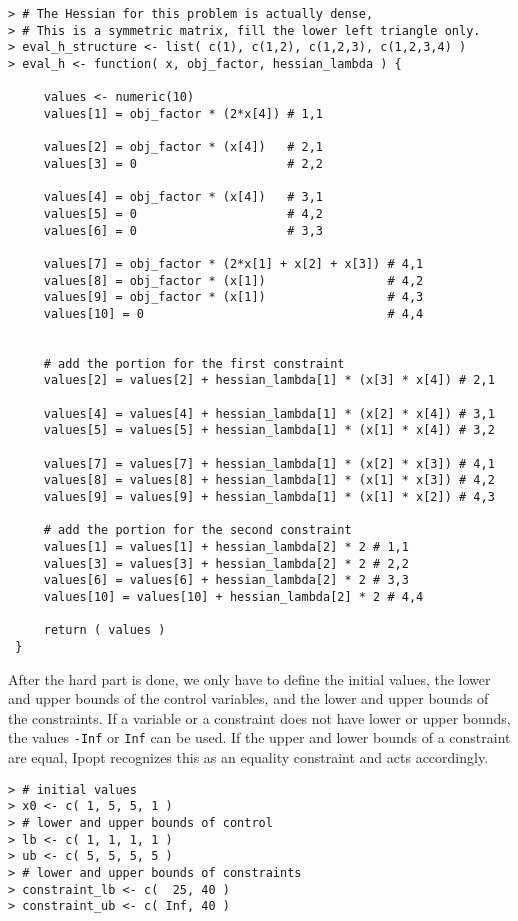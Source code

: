 \documentclass[10pt]{article}
\begin{document}
\begin{verbatim}
> # The Hessian for this problem is actually dense, 
> # This is a symmetric matrix, fill the lower left triangle only.
> eval_h_structure <- list( c(1), c(1,2), c(1,2,3), c(1,2,3,4) )
> eval_h <- function( x, obj_factor, hessian_lambda ) {
 
     values <- numeric(10)
     values[1] = obj_factor * (2*x[4]) # 1,1
 
     values[2] = obj_factor * (x[4])   # 2,1
     values[3] = 0                     # 2,2
 
     values[4] = obj_factor * (x[4])   # 3,1
     values[5] = 0                     # 4,2
     values[6] = 0                     # 3,3
 
     values[7] = obj_factor * (2*x[1] + x[2] + x[3]) # 4,1
     values[8] = obj_factor * (x[1])                 # 4,2
     values[9] = obj_factor * (x[1])                 # 4,3
     values[10] = 0                                  # 4,4
 
 
     # add the portion for the first constraint
     values[2] = values[2] + hessian_lambda[1] * (x[3] * x[4]) # 2,1
     
     values[4] = values[4] + hessian_lambda[1] * (x[2] * x[4]) # 3,1
     values[5] = values[5] + hessian_lambda[1] * (x[1] * x[4]) # 3,2
 
     values[7] = values[7] + hessian_lambda[1] * (x[2] * x[3]) # 4,1
     values[8] = values[8] + hessian_lambda[1] * (x[1] * x[3]) # 4,2
     values[9] = values[9] + hessian_lambda[1] * (x[1] * x[2]) # 4,3
 
     # add the portion for the second constraint
     values[1] = values[1] + hessian_lambda[2] * 2 # 1,1
     values[3] = values[3] + hessian_lambda[2] * 2 # 2,2
     values[6] = values[6] + hessian_lambda[2] * 2 # 3,3
     values[10] = values[10] + hessian_lambda[2] * 2 # 4,4
 
     return ( values )
 }
\end{verbatim}
After the hard part is done, we only have to define the initial values, the 
lower and upper bounds of the control variables, and the lower and upper 
bounds of the constraints. If a variable or a constraint does not have lower 
or upper bounds, the values \texttt{-Inf} or \texttt{Inf} can be used. If the 
upper and lower bounds of a constraint are equal, Ipopt recognizes this as an 
equality constraint and acts accordingly.
\begin{verbatim}
> # initial values
> x0 <- c( 1, 5, 5, 1 )
> # lower and upper bounds of control
> lb <- c( 1, 1, 1, 1 )
> ub <- c( 5, 5, 5, 5 )
> # lower and upper bounds of constraints
> constraint_lb <- c(  25, 40 )
> constraint_ub <- c( Inf, 40 )
\end{verbatim}
\end{document}
